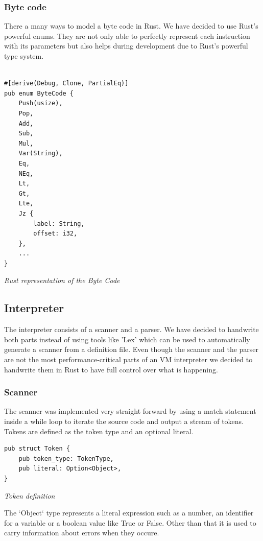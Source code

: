 \documentclass{article}
\begin{document}
\subsubsection{Byte code}
\label{sec:byte_code}

There a many ways to model a byte code in Rust. We have decided to use Rust's
powerful enums. They are not only able to perfectly represent each instruction
with its parameters but also helps during development due to Rust's powerful
type system.

\begin{verbatim}

#[derive(Debug, Clone, PartialEq)]
pub enum ByteCode {
    Push(usize),
    Pop,
    Add,
    Sub,
    Mul,
    Var(String),
    Eq,
    NEq,
    Lt,
    Gt,
    Lte,
    Jz {
        label: String,
        offset: i32,
    },
    ...
}

\end{verbatim}
\textit{Rust representation of the Byte Code} \\

\subsection{Interpreter}
The interpreter consists of a scanner and a parser. We have decided to
handwrite both parts instead of using tools like 'Lex' which can be used to
automatically generate a scanner from a definition file. Even though the
scanner and the parser are not the most performance-critical parts of an
VM interpreter we decided to handwrite them in Rust to have full control over
what is happening.

\subsubsection{Scanner}
The scanner was implemented very straight forward by using a match statement
inside a while loop to iterate the source code and output a stream of tokens.
Tokens are defined as the token type and an optional literal.

\begin{verbatim}
pub struct Token {
    pub token_type: TokenType,
    pub literal: Option<Object>,
}
\end{verbatim}
\textit{Token definition}

The `Object` type represents a literal expression such as a number, an
identifier for a variable or a boolean value like True or False. Other than
that it is used to carry information about errors when they occure.
\end{document}
